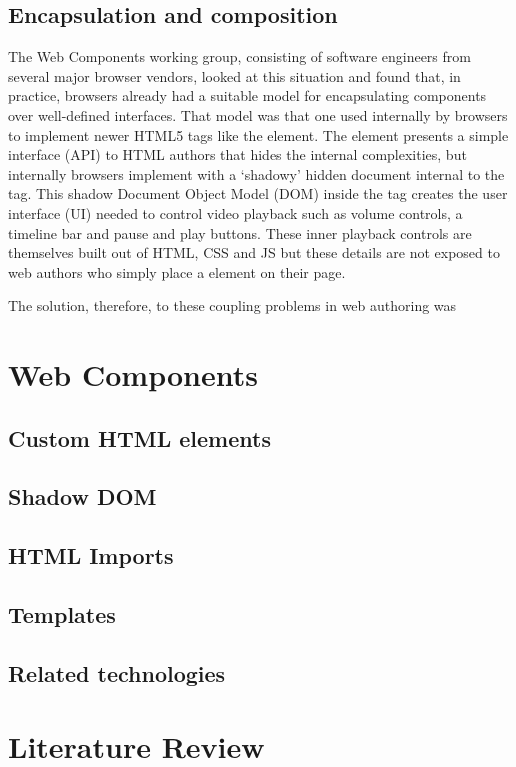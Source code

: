 \subsection{Encapsulation and composition}

The Web Components working group, consisting of software engineers from several major browser vendors, looked at this situation and found that, in practice, browsers already had a suitable model for encapsulating components over well-defined interfaces.
That model was that one used internally by browsers to implement newer HTML5 tags like the \textbf{} element. 
The  element presents a simple interface (API) to HTML authors that hides the internal complexities,
but internally browsers implement  with a `shadowy' hidden document internal to the tag. 
This shadow Document Object Model (DOM) inside the  tag creates the user interface (UI) needed to control video playback such as volume controls, a timeline bar and pause and play buttons.
These inner playback controls are themselves built out of HTML, CSS and JS but these details are not exposed to web authors who simply place a  element on their page.

The solution, therefore, to these coupling problems in web authoring was 

\section{Web Components}

\subsection{Custom HTML elements}
\subsection{Shadow DOM}
\subsection{HTML Imports}
\subsection{Templates}
\subsection{Related technologies}

\section{Literature Review}
